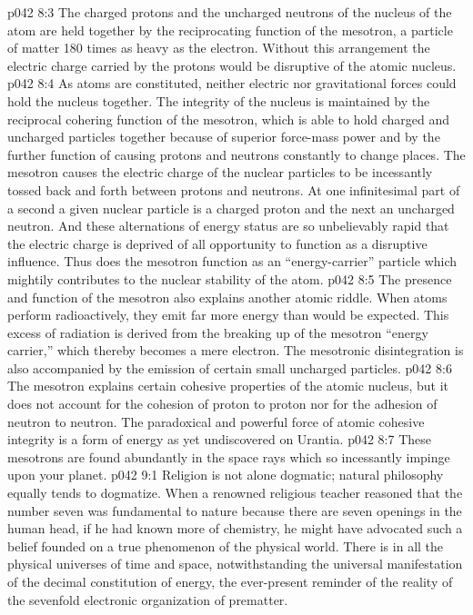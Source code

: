 \vs p042 8:3 \pc The charged protons and the uncharged neutrons of the nucleus of the atom are held together by the reciprocating function of the mesotron, a particle of matter 180 times as heavy as the electron. Without this arrangement the electric charge carried by the protons would be disruptive of the atomic nucleus.
\vs p042 8:4 As atoms are constituted, neither electric nor gravitational forces could hold the nucleus together. The integrity of the nucleus is maintained by the reciprocal cohering function of the mesotron, which is able to hold charged and uncharged particles together because of superior force\hyp{}mass power and by the further function of causing protons and neutrons constantly to change places. The mesotron causes the electric charge of the nuclear particles to be incessantly tossed back and forth between protons and neutrons. At one infinitesimal part of a second a given nuclear particle is a charged proton and the next an uncharged neutron. And these alternations of energy status are so unbelievably rapid that the electric charge is deprived of all opportunity to function as a disruptive influence. Thus does the mesotron function as an “energy\hyp{}carrier” particle which mightily contributes to the nuclear stability of the atom.
\vs p042 8:5 The presence and function of the mesotron also explains another atomic riddle. When atoms perform radioactively, they emit far more energy than would be expected. This excess of radiation is derived from the breaking up of the mesotron “energy carrier,” which thereby becomes a mere electron. The mesotronic disintegration is also accompanied by the emission of certain small uncharged particles.
\vs p042 8:6 The mesotron explains certain cohesive properties of the atomic nucleus, but it does not account for the cohesion of proton to proton nor for the adhesion of neutron to neutron. The paradoxical and powerful force of atomic cohesive integrity is a form of energy as yet undiscovered on Urantia.
\vs p042 8:7 These mesotrons are found abundantly in the space rays which so incessantly impinge upon your planet.
\vs p042 9:1 Religion is not alone dogmatic; natural philosophy equally tends to dogmatize. When a renowned religious teacher reasoned that the number seven was fundamental to nature because there are seven openings in the human head, if he had known more of chemistry, he might have advocated such a belief founded on a true phenomenon of the physical world. There is in all the physical universes of time and space, notwithstanding the universal manifestation of the decimal constitution of energy, the ever\hyp{}present reminder of the reality of the sevenfold electronic organization of prematter.
